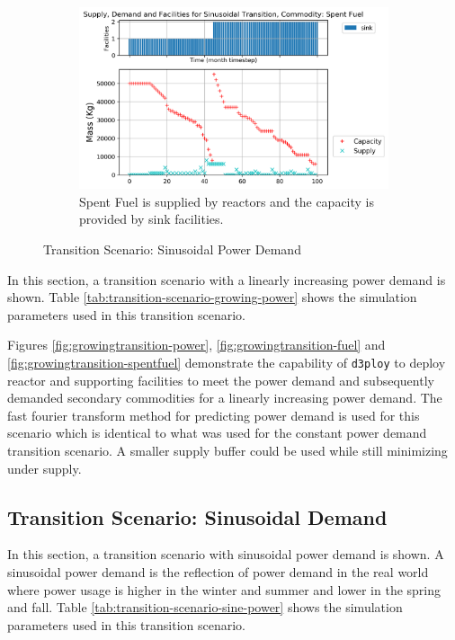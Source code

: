 \documentclass{anstrans}
\newcommand{\deploy}{\texttt{d3ploy}\xspace}%
\begin{document}
\begin{figure}[!htbp]
\begin{subfigure}[t]{0.65\textwidth}
        \centering
        \includegraphics[width=\linewidth]{figures/sinetransition-spentfuel.png} 
        \caption{Spent Fuel is supplied by reactors and the capacity is provided by sink facilities.}
        \label{fig:sinetransition-spentfuel}
    \end{subfigure}
    \caption{Transition Scenario: Sinusoidal Power Demand}
\end{figure}


In this section, a transition scenario with a linearly 
increasing power demand is shown. 
Table \ref{tab:transition-scenario-growing-power} shows the 
simulation parameters used in this transition scenario. 

Figures \ref{fig:growingtransition-power}, \ref{fig:growingtransition-fuel}
and \ref{fig:growingtransition-spentfuel} demonstrate the capability 
of \deploy to deploy reactor and supporting facilities to meet the
power demand and subsequently demanded secondary commodities 
for a linearly increasing power demand. 
The fast fourier transform method for predicting power demand is used for 
this scenario
which is identical to what was used for the constant power demand 
transition scenario. 
A smaller supply buffer could be used while still minimizing under supply. 

\subsection{\textbf{Transition Scenario: Sinusoidal Demand}}
In this section, a transition scenario with sinusoidal
power demand is shown. 
A sinusoidal power demand is the reflection of power demand in 
the real world where power usage is higher in the winter and summer
and lower in the spring and fall. 
Table \ref{tab:transition-scenario-sine-power} shows the 
simulation parameters used in this transition scenario. 
\end{document}
